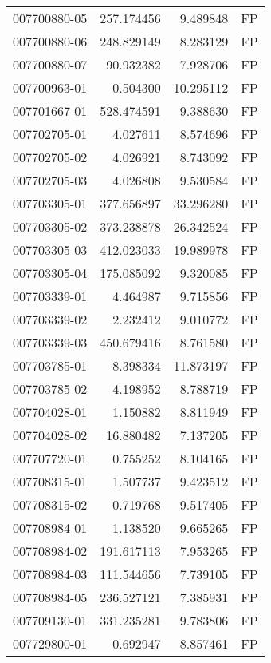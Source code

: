 \begin{tabular}{lrrl}
007700880-05 &  257.174456 &       9.489848 &   FP \\
007700880-06 &  248.829149 &       8.283129 &   FP \\
007700880-07 &   90.932382 &       7.928706 &   FP \\
007700963-01 &    0.504300 &      10.295112 &   FP \\
007701667-01 &  528.474591 &       9.388630 &   FP \\
007702705-01 &    4.027611 &       8.574696 &   FP \\
007702705-02 &    4.026921 &       8.743092 &   FP \\
007702705-03 &    4.026808 &       9.530584 &   FP \\
007703305-01 &  377.656897 &      33.296280 &   FP \\
007703305-02 &  373.238878 &      26.342524 &   FP \\
007703305-03 &  412.023033 &      19.989978 &   FP \\
007703305-04 &  175.085092 &       9.320085 &   FP \\
007703339-01 &    4.464987 &       9.715856 &   FP \\
007703339-02 &    2.232412 &       9.010772 &   FP \\
007703339-03 &  450.679416 &       8.761580 &   FP \\
007703785-01 &    8.398334 &      11.873197 &   FP \\
007703785-02 &    4.198952 &       8.788719 &   FP \\
007704028-01 &    1.150882 &       8.811949 &   FP \\
007704028-02 &   16.880482 &       7.137205 &   FP \\
007707720-01 &    0.755252 &       8.104165 &   FP \\
007708315-01 &    1.507737 &       9.423512 &   FP \\
007708315-02 &    0.719768 &       9.517405 &   FP \\
007708984-01 &    1.138520 &       9.665265 &   FP \\
007708984-02 &  191.617113 &       7.953265 &   FP \\
007708984-03 &  111.544656 &       7.739105 &   FP \\
007708984-05 &  236.527121 &       7.385931 &   FP \\
007709130-01 &  331.235281 &       9.783806 &   FP \\
007729800-01 &    0.692947 &       8.857461 &   FP \\

\end{tabular}
